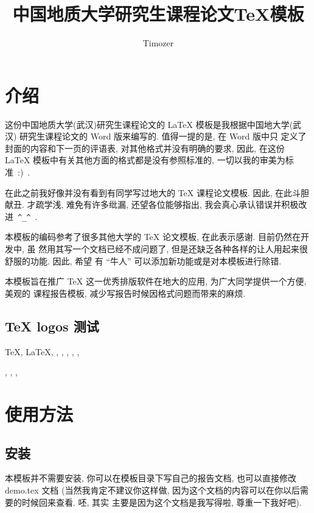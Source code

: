 \documentclass{cugrep}
\title{中国地质大学研究生课程论文\TeX{}模板}
\author{Timozer}
\begin{document}
\maketitle

\frontmatter
{}
\makeabstract 

\tableofcontents
\clearpage

\mainmatter
\chapter{介绍}
这份中国地质大学(武汉)研究生课程论文的 \LaTeX{} 模板是我根据中国地大学(武汉)
研究生课程论文的 {\sc Word} 版来编写的. 值得一提的是, 在 {\sc Word} 版中只
定义了封面的内容和下一页的评语表, 对其他格式并没有明确的要求, 因此, 在这份 \LaTeX{} 
模板中有关其他方面的格式都是没有参照标准的, 一切以我的审美为标准~:)~.

在此之前我好像并没有看到有同学写过地大的 \TeX{} 课程论文模板. 因此, 在此斗胆献丑. 
才疏学浅, 难免有许多纰漏, 还望各位能够指出, 我会真心承认错误并积极改进~\verb|^_^|~.

本模板的编码参考了很多其他大学的 \TeX{} 论文模板, 在此表示感谢. 目前仍然在开发中, 虽
然用其写一个文档已经不成问题了, 但是还缺乏各种各样的让人用起来很舒服的功能. 因此, 希望
有 ``牛人'' 可以添加新功能或是对本模板进行除错.

本模板旨在推广 \TeX{} 这一优秀排版软件在地大的应用, 为广大同学提供一个方便, 美观的
课程报告模板, 减少写报告时候因格式问题而带来的麻烦. 

\section{\TeX{} logos 测试}
\TeX{}, \LaTeX{}, \LaTeXe{}, \XeTeX{}, \XeLaTeX{}, \LuaTeX{}, \LuaLaTeX{}, 

\MF{}, \MP{}, \BIBTEX, \AMSTEX

\chapter{使用方法}
\section{安装}
本模板并不需要安装, 你可以在模板目录下写自己的报告文档, 也可以直接修改 demo.tex 文档 
(当然我肯定不建议你这样做, 因为这个文档的内容可以在你以后需要的时候回来查看. 呸, 其实
主要是因为这个文档是我写得啦, 尊重一下我好吧).
\end{document}

